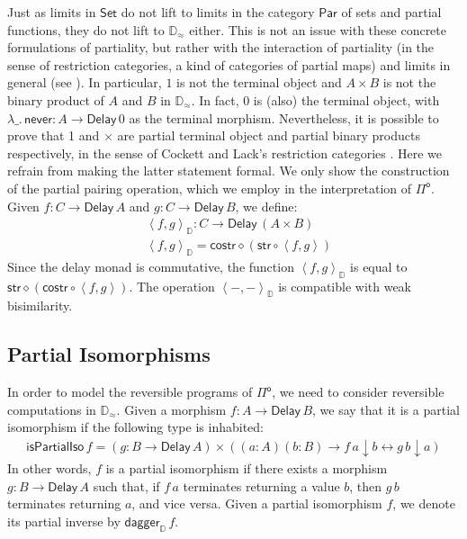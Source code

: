 \documentclass[runningheads,a4paper]{llncs}
\newcommand{\Pio}{\ensuremath{\mathsf{\Pi}^{\mathsf{o}}}}
\newcommand{\Set}{\mathsf{Set}}
\newcommand{\Par}{\mathsf{Par}}
\newcommand{\comp}{\circ}
\newcommand{\pair}[2]{\left< #1,#2 \right>}
\newcommand{\Delay}{\ensuremath{\mathsf{Delay}\,}}
\newcommand{\never}{\mathsf{never}}
\newcommand{\dn}{\downarrow}
\newcommand{\str}{\mathsf{str}}
\newcommand{\costr}{\mathsf{costr}}
\newcommand{\D}{\mathbb{D}}
\newcommand{\Dapprox}{\mathbb{D}_{\approx}}
\newcommand{\pairD}[2]{\left< #1,#2 \right>_{\D}}
\newcommand{\piso}{\mathsf{isPartialIso}}
\newcommand{\daggerD}{\mathsf{dagger}_\D}
\begin{document}
Just as limits in $\Set$ do not lift to limits in the category $\Par$ of sets
and partial functions, they do not lift to $\Dapprox$ either. This is not an
issue with these concrete formulations of partiality, but rather with the
interaction of partiality (in the sense of restriction categories, a kind of
categories of partial maps) and limits
in general (see \cite[Section 4.4]{CockettL07}). In particular, $1$ is
not the
terminal object and $A \times B$ is not the binary product of $A$ and $B$ in
$\Dapprox$. In fact, $0$ is (also) the terminal object, with $\lambda \_.\,
\never : A \to \Delay 0$ as the terminal morphism. 
Nevertheless, it is possible to prove that 1 and
$\times$ are partial terminal object and partial binary products
respectively, in the sense of Cockett and Lack's restriction
categories \cite{CockettL02,CockettL07}. Here we refrain from making the latter
statement formal. We only show the construction of the partial pairing
operation, which we employ in the interpretation of \Pio.  Given
$f : C \to \Delay A$ and $g : C \to \Delay B$, we define:
\begin{align*}
& \pairD f g : C \to \Delay (A \times B) \\
& \pairD f g = \costr \diamond (\str \comp \pair f g)
\end{align*}
Since the delay monad is commutative, the function $\pairD f g$ is
equal to $\str \diamond (\costr \comp \pair f g)$. The operation
$\pairD - -$ is compatible with weak bisimilarity.

\subsection{Partial Isomorphisms}
\label{sec:isos}

In order to model the reversible programs of \Pio, we need to consider
reversible computations in $\Dapprox$. Given a morphism $f : A \to
\Delay B$, we say that it is a partial isomorphism if the following
type is inhabited:
\begin{align*}
\piso \,f = (g : B \to \Delay A) \times \left( (a : A) (b : B) \to  f
  \,a \dn b \leftrightarrow g \,b \dn a  \right)  
\end{align*}
In other words, $f$ is a partial isomorphism if there exists a
morphism $g : B \to \Delay A$ such that, if $f\,a$ terminates
returning a value $b$, then $g\,b$ terminates returning $a$, and vice
versa. Given a partial isomorphism $f$, we denote its partial inverse
by $\daggerD\,f$.
\end{document}
